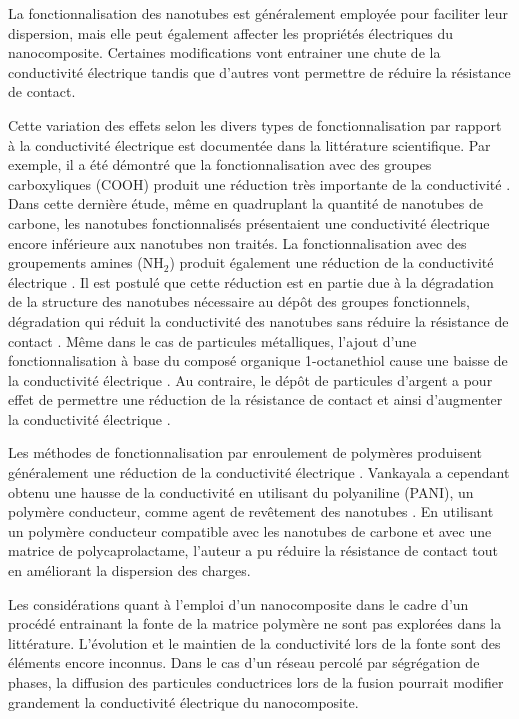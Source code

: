 La fonctionnalisation des nanotubes est généralement employée pour faciliter leur dispersion, mais elle peut également affecter les propriétés électriques du nanocomposite. 
Certaines modifications vont entrainer une chute de la conductivité électrique tandis que d'autres vont permettre de réduire la résistance de contact. 

\FloatBarrier
Cette variation des effets selon les divers types de fonctionnalisation par rapport à la conductivité électrique est documentée dans la littérature scientifique. 
Par exemple, il a été démontré que la fonctionnalisation avec des groupes carboxyliques (COOH) produit une réduction très importante de la conductivité \cite{Guadagno2011}. 
Dans cette dernière étude, même en quadruplant la quantité de nanotubes de carbone, les nanotubes fonctionnalisés présentaient une conductivité électrique encore inférieure aux nanotubes non traités. 
La fonctionnalisation avec des groupements amines (NH$_2$) produit également une réduction de la conductivité électrique \cite{Ma2008}.
Il est postulé que cette réduction est en partie due à la dégradation de la structure des nanotubes nécessaire au dépôt des groupes fonctionnels, dégradation qui réduit la conductivité des nanotubes sans réduire la résistance de contact \cite{Pandey2012a}. 
Même dans le cas de particules métalliques, l'ajout d'une fonctionnalisation à base du composé organique 
1-octanethiol cause une baisse de la conductivité électrique \cite{Gelves2008a}. 
Au contraire, le dépôt de particules d'argent a pour effet de permettre une réduction de la résistance de contact et ainsi d'augmenter la conductivité électrique \cite{Ma2010,Cauchy2017}. 

Les méthodes de fonctionnalisation par enroulement de polymères produisent généralement une réduction de la conductivité électrique \cite{Diez-Pascual2010, Huang2012}. 
Vankayala a cependant obtenu une hausse de la conductivité en utilisant du polyaniline (PANI), un polymère conducteur, comme agent de revêtement des nanotubes \cite{Vankayala2011}. 
En utilisant un polymère conducteur compatible avec les nanotubes de carbone et avec une matrice de polycaprolactame, l'auteur a pu réduire la résistance de contact tout en améliorant la dispersion des charges. 

Les considérations quant à l'emploi d'un nanocomposite dans le cadre d'un procédé entrainant la fonte de la matrice polymère ne sont pas explorées dans la littérature. 
L'évolution et le maintien de la conductivité lors de la fonte sont des éléments encore inconnus. 
Dans le cas d'un réseau percolé par ségrégation de phases, la diffusion des particules conductrices lors de la fusion pourrait modifier grandement la conductivité électrique du nanocomposite. 

